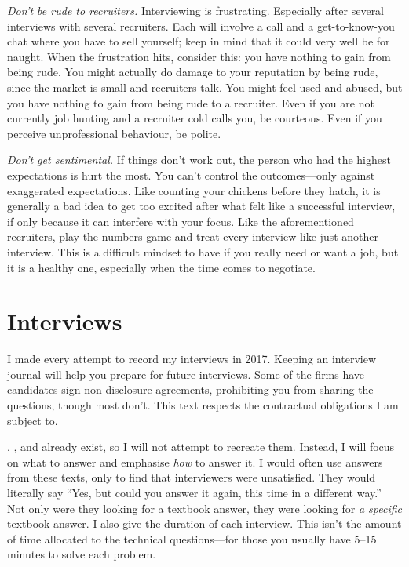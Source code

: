\documentclass[a4paper]{article}
\begin{document}
\emph{Don't be rude to recruiters.}
Interviewing is frustrating. Especially after several interviews with several recruiters.
Each will involve a call and a get-to-know-you chat where you have to sell yourself; keep in mind that it could very well be for naught.
When the frustration hits, consider this:
you have nothing to gain from being rude.
You might actually do damage to your reputation by being rude, since the market is small and recruiters talk.
You might feel used and abused, but
you have nothing to gain from being rude to a recruiter.
Even if you are not currently job hunting and a recruiter cold calls you, be courteous.
Even if you perceive unprofessional behaviour, be polite.

\emph{Don't get sentimental.}
If things don't work out, the person who had the highest expectations is hurt the most.
You can't control the outcomes---only against exaggerated expectations.
Like counting your chickens before they hatch, it is generally a bad idea to get too excited after  what felt like a successful interview, if only because it can interfere with your focus.
Like the aforementioned recruiters, play the numbers game and treat every interview like just another interview.
This is a difficult mindset to have if you really need or want a job, but it is a healthy one, especially when the time comes to negotiate.


\section{Interviews}

I made every attempt to record my interviews in 2017.
Keeping an interview journal will help you prepare for future interviews.
Some of the firms have candidates sign non-disclosure agreements, prohibiting you from sharing the questions, though most don't.
This text respects the contractual obligations I am subject to.

\citet{HeardOnTheStreet},
\citet{JoshiQA}, and
\citet{WilmottFAQ} already exist, so I will not attempt to recreate them.
Instead, I will focus on what to answer and emphasise \emph{how} to answer it.
I would often use answers from these texts, only to find that interviewers were unsatisfied.
They would literally say ``Yes, but could you answer it again, this time in a different way.''
Not only were they looking for a textbook answer, they were looking for \emph{a specific} textbook answer.
I also give the duration of each interview.
This isn't the amount of time allocated to the technical questions---for those you usually have  5--15 minutes to solve each problem.
\end{document}
